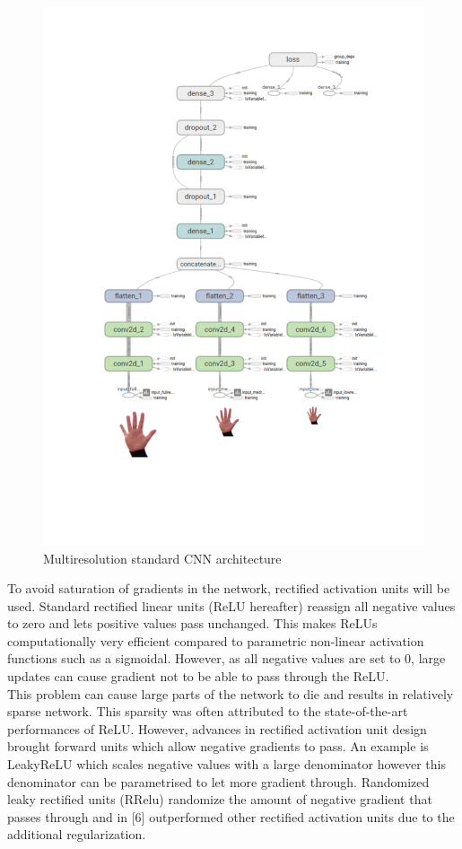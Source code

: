 \documentclass{article}
\begin{document}
\begin{figure}[h]
  \centering
  \includegraphics[scale=0.4]{tbgraph.pdf}
  \vspace*{-15mm}
  \caption{Multiresolution standard CNN architecture}
  \label{fig:multiinput}
\end{figure}

To avoid saturation of gradients in the network, rectified activation units will be used. Standard rectified linear units (ReLU hereafter) reassign all negative values to zero and lets positive values pass unchanged. This makes ReLUs computationally very efficient compared to parametric non-linear activation functions such as a sigmoidal. However, as all negative values are set to 0, large updates can cause gradient not to be able to pass through the ReLU.\\

This problem can cause large parts of the network to die and results in relatively sparse network. This sparsity was often attributed to the state-of-the-art performances of ReLU. However, advances in rectified activation unit design brought forward units which allow negative gradients to pass. An example is LeakyReLU which scales negative values with a large denominator however this denominator can be parametrised to let more gradient through. Randomized leaky rectified units (RRelu) randomize the amount of negative gradient that passes through and in [6] outperformed other rectified activation units due to the additional regularization.\\
\end{document}
